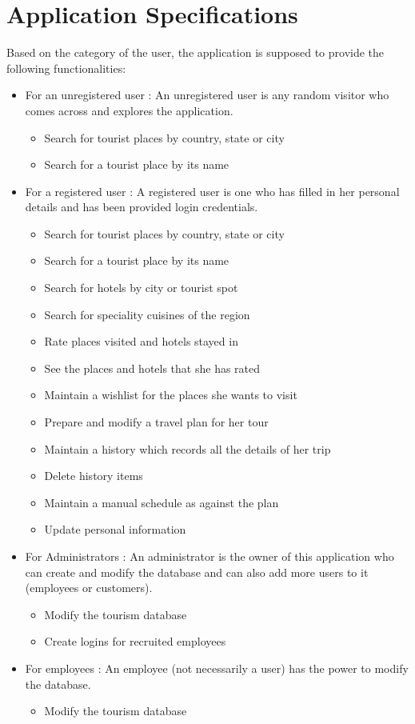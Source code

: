 \documentclass[a4paper,11pt]{article}
\begin{document}
\section{Application Specifications}
Based on the category of the user, the application is supposed to provide the following functionalities:
\begin{itemize}
\item For an unregistered user : An unregistered user is any random visitor who comes across and explores the application.
\begin{itemize}
\item Search for tourist places by country, state or city
\item Search for a tourist place by its name
\end{itemize}
\item For a registered user : A registered user is one who has filled in her personal details and has been provided login credentials.
\begin{itemize}
\item Search for tourist places by country, state or city
\item Search for a tourist place by its name
\item Search for hotels by city or tourist spot
\item Search for speciality cuisines of the region
\item Rate places visited and hotels stayed in
\item See the places and hotels that she has rated 
\item Maintain a wishlist for the places she wants to visit
\item Prepare and modify a travel plan for her tour
\item Maintain a history which records all the details of her trip
\item Delete history items
\item Maintain a manual schedule as against the plan
\item Update personal information
\end{itemize}
\item For Administrators : An administrator is the owner of this application who can create and modify the database and can also add more users to it (employees or customers).
\begin{itemize}
\item Modify the tourism database
\item Create logins for recruited employees
\end{itemize}
\item For employees : An employee (not necessarily a user) has the power to modify the database.
\begin{itemize}
\item Modify the tourism database
\end{itemize}
\end{itemize}
\end{document}
